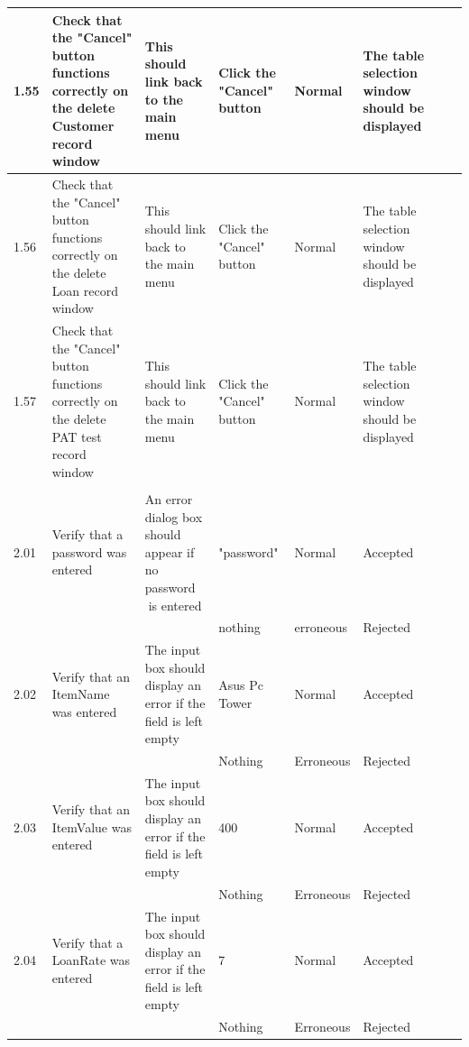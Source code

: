 \begin{landscape}
\begin{center}
\begin{longtable}{|p{1.5cm}|p{2cm}|p{3cm}|p{2cm}|p{2cm}|p{2.5cm}|p{2cm}|p{2cm}|}
        1.55 & Check that the "Cancel" button functions correctly on the delete Customer record window & This should link back to the main menu & Click the "Cancel" 
        button & Normal & The table selection window should be displayed & & \\ \hline
        
        1.56 & Check that the "Cancel" button functions correctly on the delete Loan record window & This should link back to the main menu & Click the "Cancel" 
        button & Normal & The table selection window should be displayed & & \\ \hline
        
        1.57 & Check that the "Cancel" button functions correctly on the delete PAT test record window & This should link back to the main menu & Click the "Cancel" 
        button & Normal & The table selection window should be displayed & & \\ \hline
        
        & & & & & & & \\ \hline
        
        2.01 & Verify that a password was entered & An error dialog box should appear if no password is entered & "password" & Normal & Accepted & & \\
             &                                    &                                                             &  nothing   & erroneous & Rejected & & \\ \hline
             
        2.02 & Verify that an ItemName was entered & The input box should display an error if the field is left empty & Asus Pc Tower & Normal & Accepted & & \\   
             &                                     &                                                               & Nothing       & Erroneous & Rejected & & \\ \hline
             
        2.03 & Verify that an ItemValue was entered & The input box should display an error if the field is left empty & 400 & Normal & Accepted & & \\   
             &                                     &                                                               & Nothing       & Erroneous & Rejected & & \\ \hline
             
        2.04 & Verify that a LoanRate was entered & The input box should display an error if the field is left empty & 7 & Normal & Accepted & & \\   
             &                                     &                                                               & Nothing       & Erroneous & Rejected & & \\ \hline
             

\end{longtable}
\end{center}
\end{landscape}
